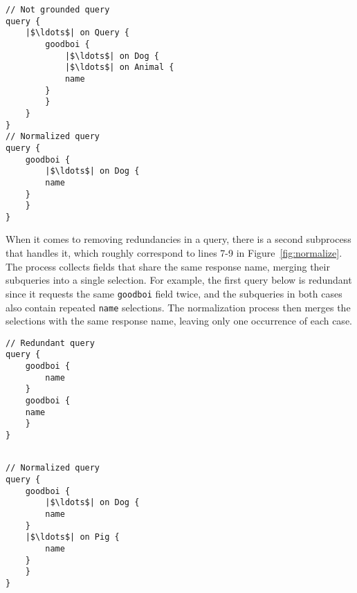 \begin{verbatim}
// Not grounded query
query {
    |$\ldots$| on Query {
        goodboi {
            |$\ldots$| on Dog {
	        |$\ldots$| on Animal {
		    name
		}
	    }
	}
}
// Normalized query
query {
    goodboi {
        |$\ldots$| on Dog {
	    name
	}
    }	
}
\end{verbatim} 

When it comes to removing redundancies in a query, there is a second subprocess that handles it, which roughly correspond to lines 7-9 in Figure~\ref{fig:normalize}. The process collects fields that share the same response name, merging their subqueries into a single selection. For example, the first query below is redundant since it requests the same \texttt{goodboi} field twice, and the subqueries in both cases also contain repeated \texttt{name} selections. The normalization process then merges the selections with the same response name, leaving only one occurrence of each case.

\begin{minipage}[t]{.25\textwidth}
\begin{verbatim}
// Redundant query
query {
    goodboi {
        name
    }
    goodboi { 
 	name
    } 
}
\end{verbatim}
\end{minipage}%
\begin{minipage}[t]{.25\textwidth}
\begin{verbatim}

// Normalized query
query {
    goodboi {
        |$\ldots$| on Dog {
	    name
	}
	|$\ldots$| on Pig {
	    name
	}
    }	
}
\end{verbatim} 
\end{minipage}


\iffalse
\begin{verbatim}
 Definition normalize_queries (s : wfGraphQLSchema)
                             (type_in_scope : Name)
                             (queries : seq Query) :
                                         seq Query :=
    if is_object_type s type_in_scope then
        normalize s type_in_scope queries
    else
        [seq on t { normalize s t queries } |
            t <- get_possible_types s type_in_scope].

\end{verbatim}
\fi


